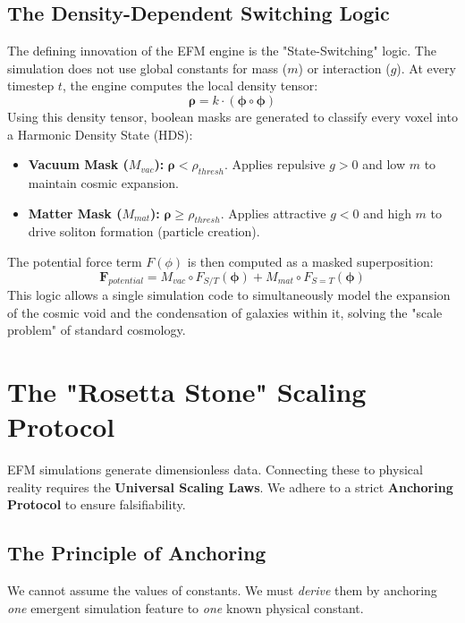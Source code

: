 \documentclass[11pt, twoside]{article}
\begin{document}
\subsection{The Density-Dependent Switching Logic}
The defining innovation of the EFM engine is the "State-Switching" logic. The simulation does not use global constants for mass ($m$) or interaction ($g$). At every timestep $t$, the engine computes the local density tensor:
\begin{equation}
\boldsymbol{\rho} = k \cdot (\boldsymbol{\phi} \circ \boldsymbol{\phi})
\end{equation}
Using this density tensor, boolean masks are generated to classify every voxel into a Harmonic Density State (HDS):
\begin{itemize}
    \item \textbf{Vacuum Mask ($M_{vac}$):} $\boldsymbol{\rho} < \rho_{thresh}$. Applies repulsive $g > 0$ and low $m$ to maintain cosmic expansion.
    \item \textbf{Matter Mask ($M_{mat}$):} $\boldsymbol{\rho} \ge \rho_{thresh}$. Applies attractive $g < 0$ and high $m$ to drive soliton formation (particle creation).
\end{itemize}
The potential force term $F(\phi)$ is then computed as a masked superposition:
\begin{equation}
\mathbf{F}_{potential} = M_{vac} \circ F_{S/T}(\boldsymbol{\phi}) + M_{mat} \circ F_{S=T}(\boldsymbol{\phi})
\end{equation}
This logic allows a single simulation code to simultaneously model the expansion of the cosmic void and the condensation of galaxies within it, solving the "scale problem" of standard cosmology.

\section{The "Rosetta Stone" Scaling Protocol}

EFM simulations generate dimensionless data. Connecting these to physical reality requires the \textbf{Universal Scaling Laws}. We adhere to a strict \textbf{Anchoring Protocol} to ensure falsifiability.

\subsection{The Principle of Anchoring}
We cannot assume the values of constants. We must \textit{derive} them by anchoring \textit{one} emergent simulation feature to \textit{one} known physical constant.
\end{document}
